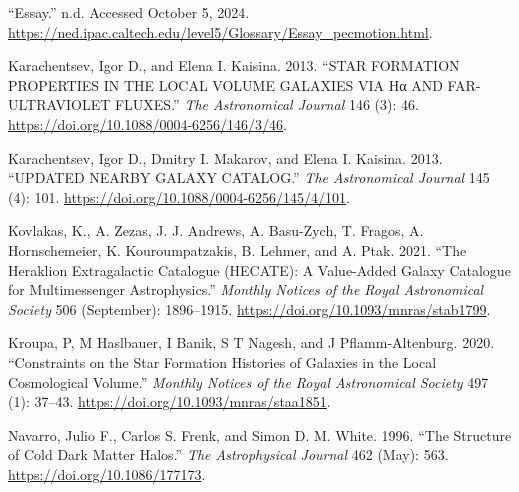 \documentclass[
]{article}
\newlength{\cslhangindent}
\newenvironment{CSLReferences}[2] %
 {\begin{list}{}{%
  \setlength{\itemindent}{0pt}
  \setlength{\leftmargin}{0pt}
  \setlength{\parsep}{0pt}
  \ifodd #1
   \setlength{\leftmargin}{\cslhangindent}
   \setlength{\itemindent}{-1\cslhangindent}
  \fi
  \setlength{\itemsep}{#2\baselineskip}}}
 {\end{list}}
\begin{document}
\label{refs}
\begin{CSLReferences}{1}{0}
{``Essay.''} n.d. Accessed October 5, 2024.
\url{https://ned.ipac.caltech.edu/level5/Glossary/Essay_pecmotion.html}.

Karachentsev, Igor D., and Elena I. Kaisina. 2013. {``{STAR FORMATION
PROPERTIES IN THE LOCAL VOLUME GALAXIES VIA Hα AND FAR-ULTRAVIOLET
FLUXES}.''} \emph{The Astronomical Journal} 146 (3): 46.
\url{https://doi.org/10.1088/0004-6256/146/3/46}.

Karachentsev, Igor D., Dmitry I. Makarov, and Elena I. Kaisina. 2013.
{``{UPDATED NEARBY GALAXY CATALOG}.''} \emph{The Astronomical Journal}
145 (4): 101. \url{https://doi.org/10.1088/0004-6256/145/4/101}.

Kovlakas, K., A. Zezas, J. J. Andrews, A. Basu-Zych, T. Fragos, A.
Hornschemeier, K. Kouroumpatzakis, B. Lehmer, and A. Ptak. 2021. {``The
{Heraklion Extragalactic Catalogue} ({HECATE}): A Value-Added Galaxy
Catalogue for Multimessenger Astrophysics.''} \emph{Monthly Notices of
the Royal Astronomical Society} 506 (September): 1896--1915.
\url{https://doi.org/10.1093/mnras/stab1799}.

Kroupa, P, M Haslbauer, I Banik, S T Nagesh, and J Pflamm-Altenburg.
2020. {``Constraints on the Star Formation Histories of Galaxies in the
{Local Cosmological Volume}.''} \emph{Monthly Notices of the Royal
Astronomical Society} 497 (1): 37--43.
\url{https://doi.org/10.1093/mnras/staa1851}.

Navarro, Julio F., Carlos S. Frenk, and Simon D. M. White. 1996. {``The
{Structure} of {Cold Dark Matter Halos}.''} \emph{The Astrophysical
Journal} 462 (May): 563. \url{https://doi.org/10.1086/177173}.

\end{CSLReferences}
\end{document}
